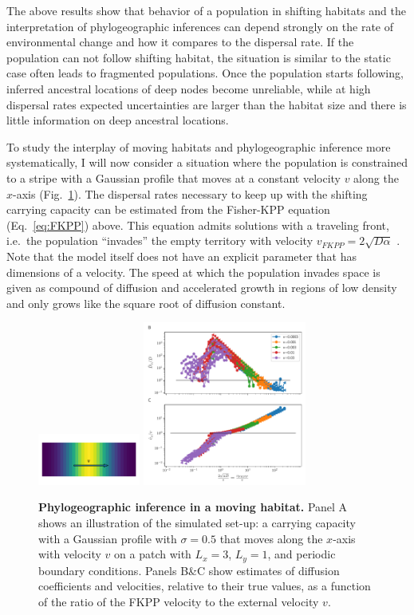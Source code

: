 \documentclass[aps,rmp, twocolumn]{revtex4}
\begin{document}
The above results show that behavior of a population in shifting habitats and the interpretation of phylogeographic inferences can depend strongly on the rate of environmental change and how it compares to the dispersal rate.
If the population can not follow shifting habitat, the situation is similar to the static case often leads to fragmented populations.
Once the population starts following, inferred ancestral locations of deep nodes become unreliable, while at high dispersal rates expected uncertainties are larger than the habitat size and there is little information on deep ancestral locations.

To study the interplay of moving habitats and phylogeographic inference more systematically, I will now consider a situation where the population is constrained to a stripe with a Gaussian profile that moves at a constant velocity $v$ along the $x$-axis (Fig.~\ref{fig:traveling_wave}).
The dispersal rates necessary to keep up with the shifting carrying capacity can be estimated from the Fisher-KPP equation (Eq.~\ref{eq:FKPP}) above.
This equation admits solutions with a traveling front, i.e.~the population ``invades'' the empty territory with velocity $v_{FKPP} = 2\sqrt{D \alpha}$ \citep{fisher_wave_1937,KPP1937,hallatschek_life_2010}.
Note that the model itself does not have an explicit parameter that has dimensions of a velocity.
The speed at which the population invades space is given as compound of diffusion and accelerated growth in regions of low density and only grows like the square root of diffusion constant.


\begin{figure}
    \includegraphics[width=0.3\textwidth]{figures/traveling_wave}
    \includegraphics[width=0.48\textwidth]{figures/waves}
    \caption{\label{fig:traveling_wave}{\bf Phylogeographic inference in a moving habitat.}
    Panel A shows an illustration of the simulated set-up: a carrying capacity with a Gaussian profile with $\sigma=0.5$ that moves along the $x$-axis with velocity $v$ on a patch with $L_x=3$, $L_y=1$, and periodic boundary conditions.
    Panels B\&C show estimates of diffusion coefficients and velocities, relative to their true values, as a function of the ratio of the FKPP velocity to the external velocity $v$. }
\end{figure}
\end{document}

